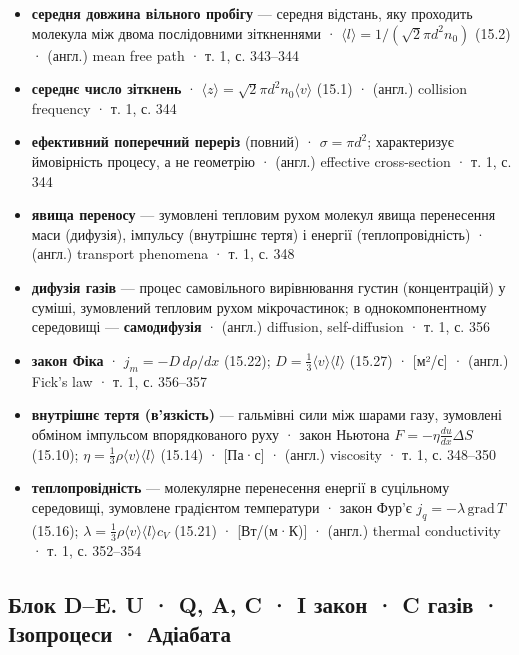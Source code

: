 \documentclass[11pt,a4paper,oneside]{book}
\newcommand{\book}{}
\begin{document}
\begin{itemize}
\item \textbf{середня довжина вільного пробігу} — середня відстань, яку проходить молекула між двома послідовними зіткненнями · $\langle l\rangle = 1/(\sqrt2\pi d^2n_0)$ (15.2) · (англ.) mean free path · \book{} т. 1, с. 343–344
\item \textbf{середнє число зіткнень} · $\langle z\rangle = \sqrt2\pi d^2n_0\langle v\rangle$ (15.1) · (англ.) collision frequency · \book{} т. 1, с. 344
\item \textbf{ефективний поперечний переріз} (повний) · $\sigma = \pi d^2$; характеризує ймовірність процесу, а не геометрію · (англ.) effective cross-section · \book{} т. 1, с. 344
\item \textbf{явища переносу} — зумовлені тепловим рухом молекул явища перенесення маси (дифузія), імпульсу (внутрішнє тертя) і енергії (теплопровідність) · (англ.) transport phenomena · \book{} т. 1, с. 348
\item \textbf{дифузія газів} — процес самовільного вирівнювання густин (концентрацій) у суміші, зумовлений тепловим рухом мікрочастинок; в однокомпонентному середовищі — \textbf{самодифузія} · (англ.) diffusion, self-diffusion · \book{} т. 1, с. 356
\item \textbf{закон Фіка} · $j_m = -D\,d\rho/dx$ (15.22); $D = \tfrac13\langle v\rangle\langle l\rangle$ (15.27) · [м²/с] · (англ.) Fick's law · \book{} т. 1, с. 356–357
\item \textbf{внутрішнє тертя (в'язкість)} — гальмівні сили між шарами газу, зумовлені обміном імпульсом впорядкованого руху · закон Ньютона $F = -\eta\frac{du}{dx}\Delta S$ (15.10); $\eta = \tfrac13\rho\langle v\rangle\langle l\rangle$ (15.14) · [Па·с] · (англ.) viscosity · \book{} т. 1, с. 348–350
\item \textbf{теплопровідність} — молекулярне перенесення енергії в суцільному середовищі, зумовлене градієнтом температури · закон Фур'є $j_q = -\lambda\,\text{grad}\,T$ (15.16); $\lambda = \tfrac13\rho\langle v\rangle\langle l\rangle c_V$ (15.21) · [Вт/(м·К)] · (англ.) thermal conductivity · \book{} т. 1, с. 352–354
\end{itemize}

\subsection*{Блок D–E. U · Q, A, C · I закон · C газів · Ізопроцеси · Адіабата}
\end{document}
